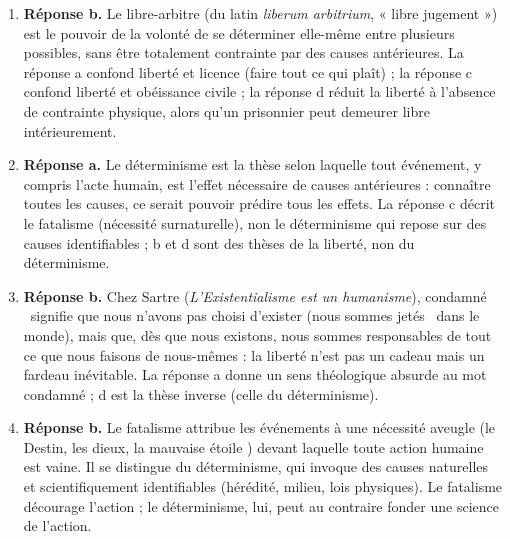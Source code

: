 \documentclass[11pt]{article}
\newcommand{\cle}[1]{{\popxbold\color{popdark}#1}}
\begin{document}
\begin{corrige}
\begin{enumerate}
\item \textbf{Réponse b.} Le \cle{libre-arbitre} (du latin \emph{liberum arbitrium}, « libre jugement ») est le pouvoir de la volonté de se déterminer elle-même entre plusieurs possibles, sans être totalement contrainte par des causes antérieures. La réponse a confond liberté et licence (faire tout ce qui plaît) ; la réponse c confond liberté et obéissance civile ; la réponse d réduit la liberté à l'absence de contrainte physique, alors qu'un prisonnier peut demeurer libre intérieurement.
\item \textbf{Réponse a.} Le \cle{déterminisme} est la thèse selon laquelle tout événement, y compris l'acte humain, est l'effet nécessaire de causes antérieures : connaître toutes les causes, ce serait pouvoir prédire tous les effets. La réponse c décrit le \cle{fatalisme} (nécessité surnaturelle), non le déterminisme qui repose sur des causes identifiables ; b et d sont des thèses de la liberté, non du déterminisme.
\item \textbf{Réponse b.} Chez Sartre (\emph{L'Existentialisme est un humanisme}), \guillemotleft condamné \guillemotright\ signifie que nous n'avons pas choisi d'exister (nous sommes \guillemotleft jetés \guillemotright\ dans le monde), mais que, dès que nous existons, nous sommes responsables de tout ce que nous faisons de nous-mêmes : la liberté n'est pas un cadeau mais un fardeau inévitable. La réponse a donne un sens théologique absurde au mot \guillemotleft condamné \guillemotright ; d est la thèse inverse (celle du déterminisme).
\item \textbf{Réponse b.} Le \cle{fatalisme} attribue les événements à une nécessité aveugle (le Destin, les dieux, la \guillemotleft mauvaise étoile \guillemotright) devant laquelle toute action humaine est vaine. Il se distingue du déterminisme, qui invoque des causes naturelles et scientifiquement identifiables (hérédité, milieu, lois physiques). Le fatalisme décourage l'action ; le déterminisme, lui, peut au contraire fonder une science de l'action.
\end{enumerate}
\end{corrige}
\end{document}
